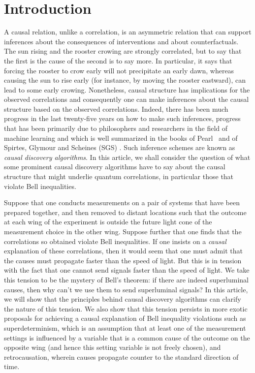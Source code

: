\documentclass[letterpaper,onecolumn,nofootinbib]{revtex4}
\begin{document}
\section{Introduction}
\label{sec:intro}

A causal relation, unlike a correlation, is an asymmetric relation that can
support inferences about the consequences of interventions and about
counterfactuals. The sun rising and the rooster crowing are strongly
correlated, but to say that the first is the cause of the second is to say
more. In particular, it says that forcing the rooster to crow early will not
precipitate an early dawn, whereas causing the sun to rise early (for
instance, by moving the rooster eastward), can lead to some early crowing.
Nonetheless, causal structure has implications for the observed correlations
and consequently one can make inferences about the causal structure based on
the observed correlations. Indeed, there has been much progress in the
last twenty-five years on how to make such inferences, progress that has
been primarily due to philosophers and researchers in the field of machine
learning and which is well summarized in the books of Pearl~\cite{Pearl2009} and of Spirtes, Glymour
and Scheines (SGS) \cite{Spirtes2001}. Such inference schemes are known
as \emph{causal discovery algorithms}. In this article, we shall consider
the question of what some prominent causal discovery algorithms have to say about
the causal structure that might underlie quantum correlations, in particular
those that violate Bell inequalities.

Suppose that one conducts measurements on a pair of systems that have been
prepared together, and then removed to distant locations such that the
outcome at each wing of the experiment is outside the future light cone of
the measurement choice in the other wing. Suppose further that one finds that the
correlations so obtained violate Bell inequalities.  If one insists on a \emph{causal} explanation of these correlations, then it would seem that one must admit that the causes must propagate faster than the speed of light. But this is in tension with the fact that one cannot send signals faster than the speed of light. We take this tension to be the mystery of Bell's theorem: if there are indeed
superluminal causes, then why can't we use them to send superluminal
signals? In this article, we will show that the principles behind causal
discovery algorithms can clarify the nature of this tension.  We also show that this tension persists in more exotic proposals for achieving a causal explanation of Bell inequality violations such as superdeterminism, which is an assumption that at least one of the measurement settings is influenced by a variable that is a common cause of the outcome on the opposite wing (and hence this setting variable is not freely chosen), and retrocausation, wherein causes propagate counter to the standard direction of time.
\end{document}
